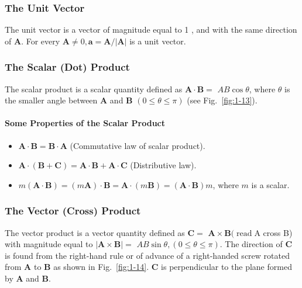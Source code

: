 \documentclass[10pt]{article}
\numberwithin{equation}{section}
\begin{document}
\subsubsection{The Unit Vector}\label{sec:1-6-8}
The unit vector is a vector of magnitude equal to 1 , and with the same direction of $\mathbf{A}$. For every $\mathbf{A} \neq 0, \mathbf{a}=\mathbf{A} /|\mathbf{A}|$ is a unit vector.

\subsubsection{The Scalar (Dot) Product}\label{sec:1-6-9}
The scalar product is a scalar quantity defined as $\mathbf{A} \cdot \mathbf{B}=$ $A B \cos \theta$, where $\theta$ is the smaller angle between $\mathbf{A}$ and $\mathbf{B}$ $(0 \leq \theta \leq \pi)$ (see Fig.~\ref{fig:1-13}).

\paragraph{Some Properties of the Scalar Product}\label{sec:1-6-9-1}
\begin{itemize}
  \item $\mathbf{A} \cdot \mathbf{B}=\mathbf{B} \cdot \mathbf{A}$ (Commutative law of scalar product).
  \item $\mathbf{A} \cdot(\mathbf{B}+\mathbf{C})=\mathbf{A} \cdot \mathbf{B}+\mathbf{A} \cdot \mathbf{C}$ (Distributive law).
  \item $m(\mathbf{A} \cdot \mathbf{B})=(m \mathbf{A}) \cdot \mathbf{B}=\mathbf{A} \cdot(m \mathbf{B})=(\mathbf{A} \cdot \mathbf{B}) m$, where $m$ is a scalar.
\end{itemize}

\subsubsection{The Vector (Cross) Product}\label{sec:1-6-10}
The vector product is a vector quantity defined as $\mathbf{C}=$ $\mathbf{A} \times \mathbf{B}(\operatorname{read} \mathrm{A}$ cross B) with magnitude equal to $|\mathbf{A} \times \mathbf{B}|=$ $A B \sin \theta,(0 \leq \theta \leq \pi)$. The direction of $\mathbf{C}$ is found from the right-hand rule or of advance of a right-handed screw rotated from $\mathbf{A}$ to $\mathbf{B}$ as shown in Fig.~\ref{fig:1-14}. $\mathbf{C}$ is perpendicular to the plane formed by $\mathbf{A}$ and $\mathbf{B}$.
\end{document}
